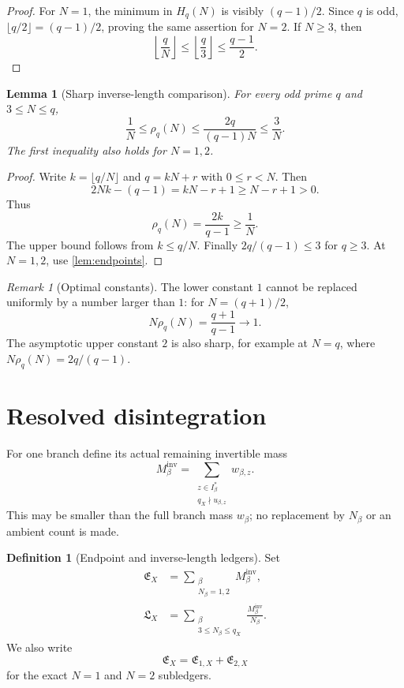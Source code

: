 \documentclass[11pt]{article}
\newtheorem{lemma}[theorem]{Lemma}
\theoremstyle{definition}
\newtheorem{definition}[theorem]{Definition}
\theoremstyle{remark}
\newtheorem{remark}[theorem]{Remark}
\newcommand{\EX}{\mathfrak E_X}
\newcommand{\LX}{\mathfrak L_X}
\begin{document}
\begin{proof}
For \(N=1\), the minimum in \(H_q(N)\) is visibly
\((q-1)/2\).  Since \(q\) is odd,
\(\lfloor q/2\rfloor=(q-1)/2\), proving the same assertion for
\(N=2\).  If \(N\ge3\), then
\[
 \left\lfloor\frac qN\right\rfloor
 \le\left\lfloor\frac q3\right\rfloor
 \le\frac{q-1}{2}.
\]
\end{proof}

\begin{lemma}[Sharp inverse-length comparison]
\label{lem:comparison}
For every odd prime \(q\) and \(3\le N\le q\),
\begin{equation}
 \frac1N
 \le\rho_q(N)
 \le\frac{2q}{(q-1)N}
 \le\frac3N.
\label{eq:comparison}
\end{equation}
The first inequality also holds for \(N=1,2\).
\end{lemma}

\begin{proof}
Write \(k=\lfloor q/N\rfloor\) and \(q=kN+r\) with
\(0\le r<N\).  Then
\[
 2Nk-(q-1)=kN-r+1\ge N-r+1>0.
\]
Thus
\[
 \rho_q(N)=\frac{2k}{q-1}\ge\frac1N.
\]
The upper bound follows from \(k\le q/N\).  Finally
\(2q/(q-1)\le3\) for \(q\ge3\).  At \(N=1,2\), use
\cref{lem:endpoints}.
\end{proof}

\begin{remark}[Optimal constants]
The lower constant \(1\) cannot be replaced uniformly by a number
larger than \(1\): for \(N=(q+1)/2\),
\[
 N\rho_q(N)=\frac{q+1}{q-1}\longrightarrow1.
\]
The asymptotic upper constant \(2\) is also sharp, for example at
\(N=q\), where \(N\rho_q(N)=2q/(q-1)\).
\end{remark}

\section{Resolved disintegration}
\label{sec:disintegration}

For one branch define its actual remaining invertible mass
\[
 M_\beta^{\mathrm{inv}}
 =
 \sum_{\substack{z\in I_\beta^\ast\\q_X\nmid u_{\beta,z}}}
 w_{\beta,z}.
\]
This may be smaller than the full branch mass \(w_\beta\); no
replacement by \(N_\beta\) or an ambient count is made.

\begin{definition}[Endpoint and inverse-length ledgers]
\label{def:ledgers}
Set
\begin{align}
 \EX
 &=
 \sum_{\substack{\beta\\N_\beta=1,2}}
 M_\beta^{\mathrm{inv}},
\label{eq:E}\\
 \LX
 &=
 \sum_{\substack{\beta\\3\le N_\beta\le q_X}}
 \frac{M_\beta^{\mathrm{inv}}}{N_\beta}.
\label{eq:L}
\end{align}
We also write
\[
 \EX=\mathfrak E_{1,X}+\mathfrak E_{2,X}
\]
for the exact \(N=1\) and \(N=2\) subledgers.
\end{definition}
\end{document}
